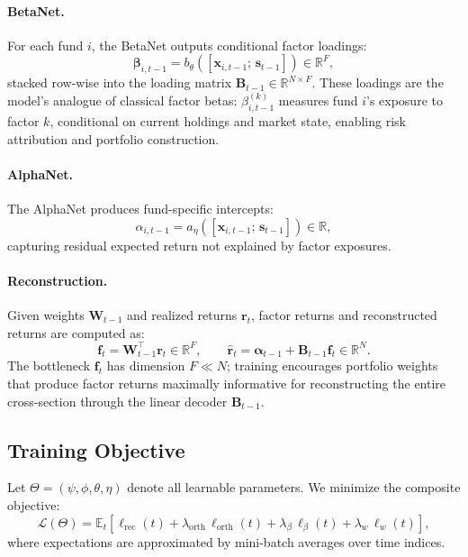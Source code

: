 \paragraph{BetaNet.} For each fund $i$, the BetaNet outputs conditional factor loadings:
\begin{equation}\label{eq:betanet}
    \boldsymbol{\beta}_{i,t-1} = b_\theta\!\left([\mathbf{x}_{i,t-1};\, \mathbf{s}_{t-1}]\right) \in \mathbb{R}^{F},
\end{equation}
stacked row-wise into the loading matrix $\mathbf{B}_{t-1} \in \mathbb{R}^{N \times F}$. These loadings are the model's analogue of classical factor betas: $\beta_{i,t-1}^{(k)}$ measures fund $i$'s exposure to factor $k$, conditional on current holdings and market state, enabling risk attribution and portfolio construction.

\paragraph{AlphaNet.} The AlphaNet produces fund-specific intercepts:
\begin{equation}\label{eq:alphanet}
    \alpha_{i,t-1} = a_\eta\!\left([\mathbf{x}_{i,t-1};\, \mathbf{s}_{t-1}]\right) \in \mathbb{R},
\end{equation}
capturing residual expected return not explained by factor exposures.

\paragraph{Reconstruction.} Given weights $\mathbf{W}_{t-1}$ and realized returns $\mathbf{r}_t$, factor returns and reconstructed returns are computed as:
\begin{equation}\label{eq:reconstruction}
    \mathbf{f}_t = \mathbf{W}_{t-1}^\top \mathbf{r}_t \in \mathbb{R}^F, \qquad \hat{\mathbf{r}}_t = \boldsymbol{\alpha}_{t-1} + \mathbf{B}_{t-1} \mathbf{f}_t \in \mathbb{R}^N.
\end{equation}
The bottleneck $\mathbf{f}_t$ has dimension $F \ll N$; training encourages portfolio weights that produce factor returns maximally informative for reconstructing the entire cross-section through the linear decoder $\mathbf{B}_{t-1}$.


\subsection{Training Objective}\label{sec:training}

Let $\Theta = (\psi, \phi, \theta, \eta)$ denote all learnable parameters. We minimize the composite objective:
\begin{equation}\label{eq:total-loss}
    \mathcal{L}(\Theta) = \mathbb{E}_{t}\!\left[\ell_{\mathrm{rec}}(t) + \lambda_{\mathrm{orth}}\,\ell_{\mathrm{orth}}(t) + \lambda_{\beta}\,\ell_{\beta}(t) + \lambda_{w}\,\ell_{w}(t)\right],
\end{equation}
where expectations are approximated by mini-batch averages over time indices.

